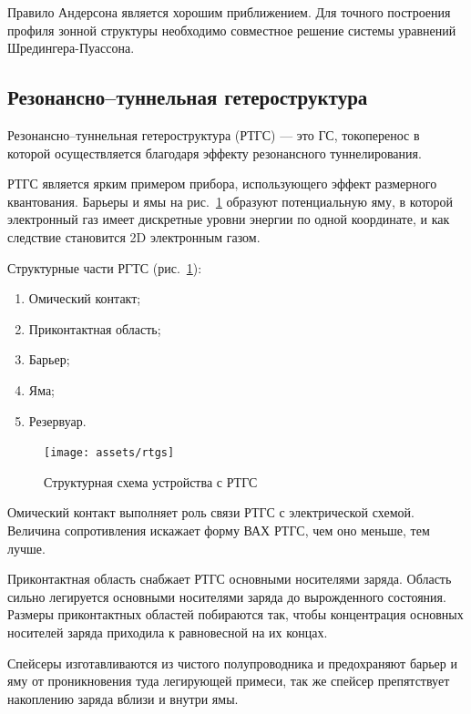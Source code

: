 Правило Андерсона является хорошим приближением. Для точного построения профиля зонной структуры необходимо совместное решение системы уравнений Шредингера-Пуассона.


\subsection{Резонансно--туннельная гетероструктура}
Резонансно--туннельная гетероструктура (РТГС) --- это ГС, токоперенос в которой осуществляется благодаря эффекту резонансного туннелирования.

РТГС является ярким примером прибора, использующего эффект размерного квантования. Барьеры и ямы на рис.~\ref{img:rtgs} образуют потенциальную яму, в которой электронный газ имеет дискретные уровни энергии по одной координате, и как следствие становится 2D электронным газом.

Структурные части РГТС (рис.~\ref{img:rtgs}):
\begin{enumerate}
  \item Омический контакт;
  \item Приконтактная область;
  \item Барьер;
  \item Яма;
  \item Резервуар.
\end{enumerate}

\begin{figure}[h]
  \centering
  \texttt{[image: assets/rtgs]}
  \caption{Структурная схема устройства с РТГС}
  \label{img:rtgs}
\end{figure}

Омический контакт выполняет роль связи РТГС с электрической схемой. Величина сопротивления искажает форму ВАХ РТГС, чем оно меньше, тем лучше.

Приконтактная область снабжает РТГС основными носителями заряда. Область сильно легируется основными носителями заряда до вырожденного состояния. Размеры приконтактных областей побираются так, чтобы концентрация основных носителей заряда приходила к равновесной на их концах.

Спейсеры изготавливаются из чистого полупроводника и предохраняют барьер и яму от проникновения туда легирующей примеси, так же спейсер препятствует накоплению заряда вблизи и внутри ямы.

